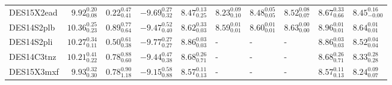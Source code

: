 \documentclass[fleqn,usenatbib,]{mnras}
\begin{document}
\begin{table}
\begin{threeparttable}
\begin{tabular}{lrrrllllll}
DES15X2ead &   $9.92 _{\scriptscriptstyle 0.08} ^{\scriptscriptstyle 0.20}$ &   $0.22 _{\scriptscriptstyle 0.41} ^{\scriptscriptstyle 0.47}$ &   $-9.69 _{\scriptscriptstyle 0.32} ^{\scriptscriptstyle 0.27}$ &  $8.47 _{\scriptscriptstyle 0.25} ^{\scriptscriptstyle 0.13}$ &  $8.23 _{\scriptscriptstyle 0.10} ^{\scriptscriptstyle 0.09}$ &  $8.48 _{\scriptscriptstyle 0.05} ^{\scriptscriptstyle 0.05}$ &  $8.52 _{\scriptscriptstyle 0.07} ^{\scriptscriptstyle 0.08}$ &  $8.67 _{\scriptscriptstyle 0.66} ^{\scriptscriptstyle 0.33}$ &  $8.45 _{\scriptscriptstyle -0.00} ^{\scriptscriptstyle 0.16}$ \\
DES14S2plb &  $10.36 _{\scriptscriptstyle 0.23} ^{\scriptscriptstyle 0.25}$ &   $0.89 _{\scriptscriptstyle 0.64} ^{\scriptscriptstyle 0.77}$ &   $-9.47 _{\scriptscriptstyle 0.40} ^{\scriptscriptstyle 0.52}$ &  $8.62 _{\scriptscriptstyle 0.03} ^{\scriptscriptstyle 0.33}$ &  $8.59 _{\scriptscriptstyle 0.01} ^{\scriptscriptstyle 0.01}$ &  $8.60 _{\scriptscriptstyle 0.01} ^{\scriptscriptstyle 0.01}$ &  $8.63 _{\scriptscriptstyle 0.00} ^{\scriptscriptstyle 0.00}$ &  $8.96 _{\scriptscriptstyle 0.01} ^{\scriptscriptstyle 0.01}$ &   $8.64 _{\scriptscriptstyle 0.01} ^{\scriptscriptstyle 0.01}$ \\
DES14S2pli &  $10.27 _{\scriptscriptstyle 0.11} ^{\scriptscriptstyle 0.34}$ &   $0.50 _{\scriptscriptstyle 0.38} ^{\scriptscriptstyle 0.61}$ &   $-9.77 _{\scriptscriptstyle 0.27} ^{\scriptscriptstyle 0.27}$ &  $8.86 _{\scriptscriptstyle 0.03} ^{\scriptscriptstyle 0.03}$ &                                                             - &                                                             - &                                                             - &  $8.86 _{\scriptscriptstyle 0.03} ^{\scriptscriptstyle 0.03}$ &   $8.52 _{\scriptscriptstyle 0.04} ^{\scriptscriptstyle 0.04}$ \\
DES14C3tnz &  $10.21 _{\scriptscriptstyle 0.22} ^{\scriptscriptstyle 0.41}$ &   $0.78 _{\scriptscriptstyle 0.60} ^{\scriptscriptstyle 0.88}$ &   $-9.44 _{\scriptscriptstyle 0.38} ^{\scriptscriptstyle 0.47}$ &  $8.68 _{\scriptscriptstyle 0.71} ^{\scriptscriptstyle 0.26}$ &                                                             - &                                                             - &                                                             - &  $8.68 _{\scriptscriptstyle 0.71} ^{\scriptscriptstyle 0.26}$ &   $8.33 _{\scriptscriptstyle 0.28} ^{\scriptscriptstyle 0.28}$ \\
DES15X3mxf &   $9.93 _{\scriptscriptstyle 0.30} ^{\scriptscriptstyle 0.32}$ &   $0.78 _{\scriptscriptstyle 1.18} ^{\scriptscriptstyle 0.90}$ &   $-9.15 _{\scriptscriptstyle 0.88} ^{\scriptscriptstyle 0.58}$ &  $8.57 _{\scriptscriptstyle 0.13} ^{\scriptscriptstyle 0.11}$ &                                                             - &                                                             - &                                                             - &  $8.57 _{\scriptscriptstyle 0.13} ^{\scriptscriptstyle 0.11}$ &   $8.24 _{\scriptscriptstyle 0.07} ^{\scriptscriptstyle 0.09}$ \\

\end{tabular}
\end{threeparttable}
\end{table}
\end{document}
